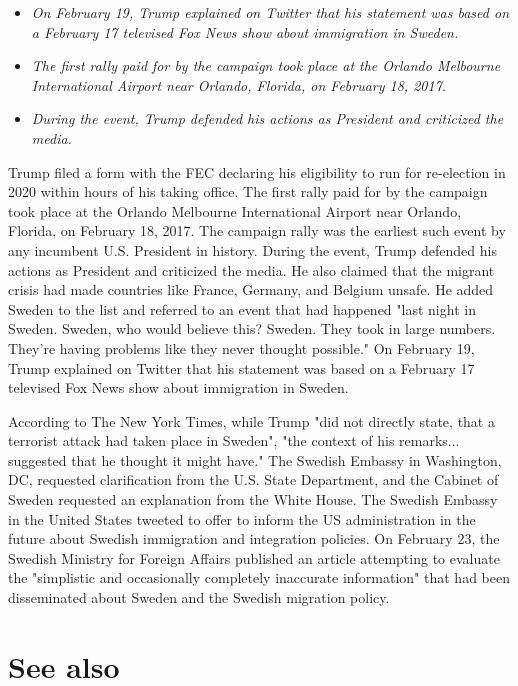 \begin{itemize}
\item
  \emph{On February 19, Trump explained on Twitter that his statement
  was based on a February 17 televised Fox News show about immigration
  in Sweden.}
\item
  \emph{The first rally paid for by the campaign took place at the
  Orlando Melbourne International Airport near Orlando, Florida, on
  February 18, 2017.}
\item
  \emph{During the event, Trump defended his actions as President and
  criticized the media.}
\end{itemize}

Trump filed a form with the FEC declaring his eligibility to run for
re-election in 2020 within hours of his taking office. The first rally
paid for by the campaign took place at the Orlando Melbourne
International Airport near Orlando, Florida, on February 18, 2017. The
campaign rally was the earliest such event by any incumbent U.S.
President in history. During the event, Trump defended his actions as
President and criticized the media. He also claimed that the migrant
crisis had made countries like France, Germany, and Belgium unsafe. He
added Sweden to the list and referred to an event that had happened
"last night in Sweden. Sweden, who would believe this? Sweden. They took
in large numbers. They're having problems like they never thought
possible." On February 19, Trump explained on Twitter that his statement
was based on a February 17 televised Fox News show about immigration in
Sweden.

According to The New York Times, while Trump "did not directly state,
that a terrorist attack had taken place in Sweden", "the context of his
remarks... suggested that he thought it might have." The Swedish Embassy
in Washington, DC, requested clarification from the U.S. State
Department, and the Cabinet of Sweden requested an explanation from the
White House. The Swedish Embassy in the United States tweeted to offer
to inform the US administration in the future about Swedish immigration
and integration policies. On February 23, the Swedish Ministry for
Foreign Affairs published an article attempting to evaluate the
"simplistic and occasionally completely inaccurate information" that had
been disseminated about Sweden and the Swedish migration policy.

\section{See also}\label{see-also}

